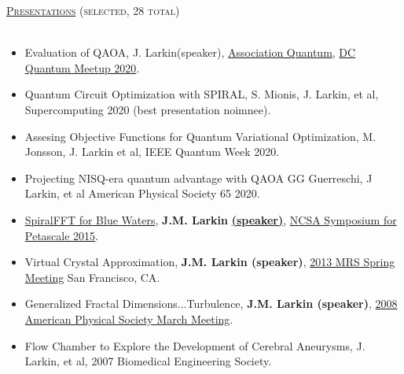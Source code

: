 \documentclass{article}
\newcommand{\lineunder}{\vspace*{-8pt} \\ \hspace*{-18pt} \hrulefill \\}
\newcommand{\header}[1]{{\hspace*{-15pt}\vspace*{6pt} \textsc{#1}} \vspace*{-6pt} \lineunder}
\newenvironment{achievements}{\begin{list}{$\bullet$}{\topsep 0pt \itemsep -2pt}}{\vspace*{4pt}\end{list}}
\begin{document}
\header{\Large{\href{http://jasonlarkin.org/pres.html}{Presentations} (selected, 28 total)}}
\begin{itemize}[leftmargin=*]
\item Evaluation of QAOA, J. Larkin(speaker), \href{https://www.youtube.com/watch?v=I7yp-qXk0Zo}{Association Quantum}, \href{https://www.meetup.com/Washington-Quantum-Computing-Meetup/events/272829277/}{DC Quantum Meetup 2020}. 
\item Quantum Circuit Optimization with SPIRAL, S. Mionis, J. Larkin, et al, Supercomputing 2020 (best presentation noimnee). 
\item Assesing Objective Functions for Quantum Variational Optimization, M. Jonsson, J. Larkin et al, IEEE Quantum Week 2020. 
\item Projecting NISQ-era quantum advantage with QAOA
GG Guerreschi, J Larkin, et al American Physical Society 65 2020.
\item \href{https://bluewaters.ncsa.illinois.edu/documents/10157/5a0a0d37-95bf-460b-a7f0-cfadd15abec8}{SpiralFFT for Blue Waters}, \textbf{J.M. Larkin} \href{https://www.youtube.com/watch?v=rjbEWeu2Nwc&feature=youtu.be#t=51m53s}{\textbf{(speaker)}}, \href{https://bluewaters.ncsa.illinois.edu/paid-ime#SPIRAL FFT}{NCSA Symposium for Petascale 2015}.
\item Virtual Crystal Approximation, \textbf{J.M. Larkin (speaker)}, \href{http://www.mrs.org/spring2013/}{2013 MRS Spring Meeting} San Francisco, CA.
\item Generalized Fractal Dimensions...Turbulence, \textbf{J.M. Larkin (speaker)}, \href{http://meetings.aps.org/Meeting/MAR08/Content/1017}{2008 American Physical Society March Meeting}.
\item Flow Chamber to Explore the Development of Cerebral Aneurysms, J. Larkin, et al, 2007 Biomedical Engineering Society. 
\end{itemize}


\end{document}
